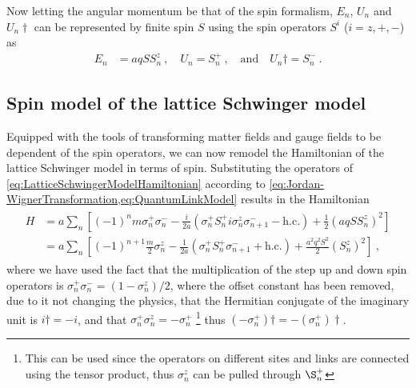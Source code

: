\documentclass[../main.tex]{subfiles} %
\begin{document}
Now letting the angular momentum be that of the spin formalism, $E_n$, $U_n$ and $U_n\dagger$ can be represented by finite spin $S$ using the spin operators $S^i$ ($i=z,+,-$) as
\begin{align} \label{eq:QuantumLinkModel}
    E_n &= aq S S_n^z \: , \quad
    U_n = S_n^+ \: , \quad \text{and} \quad
    U_n\dagger = S_n^- \: .
\end{align}



\subsection{Spin model of the lattice Schwinger model} \label{sec:SpinModelOfTheLatticeSchwingerModel}

Equipped with the tools of transforming matter fields and gauge fields to be dependent of the spin operators, we can now remodel the Hamiltonian of the lattice Schwinger model in terms of spin. Substituting the operators of \cref{eq:LatticeSchwingerModelHamiltonian} according to \cref{eq:Jordan-WignerTransformation,eq:QuantumLinkModel} results in the Hamiltonian
\begin{align} \label{eq:LatticeSchwingerModelHamiltonianSpin}
\begin{split}
    H &= a \sum_n \left[ (-1)^n m \sigma_n^+ \sigma_n^- - \frac{i}{2a} \left( \sigma_n^+ S_n^+ i \sigma_n^z \sigma_{n+1}^- - \mathrm{h.c.} \right) + \frac{1}{2} \left( aq S S_n^z \right)^2 \right] \\
        &= a \sum_n \left[ (-1)^{n+1} \frac{m}{2} \sigma_n^z - \frac{1}{2a} \left( \sigma_n^+ S_n^+ \sigma_{n+1}^- + \mathrm{h.c.} \right) + \frac{a^2 q^2 S^2}{2} \left( S_n^z \right)^2 \right] \: ,
\end{split}
\end{align}
where we have used the fact that the multiplication of the step up and down spin operators is $\sigma_n^+ \sigma_n^- = (1 - \sigma_n^z)/2$, where the offset constant has been removed, due to it not changing the physics, that the Hermitian conjugate of the imaginary unit is $i\dagger = -i$, and that $\sigma_n^+ \sigma_n^z = -\sigma_n^+$ \footnote{This can be used since the operators on different sites and links are connected using the tensor product, thus $\sigma_n^z$ can be pulled through $\S_n^+$} thus $(-\sigma_n^+)\dagger = - (\sigma_n^+)\dagger$.
\end{document}
